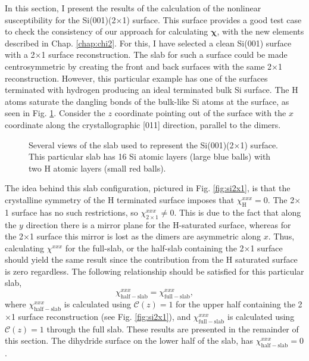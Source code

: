 In this section, I present the results of the calculation of the nonlinear
susceptibility for the Si(001)(2$\times$1) surface. This surface provides a good
test case to check the consistency of our approach for calculating
$\boldsymbol{\chi}$, with the new elements described in Chap. \ref{chap:chi2}.
For this, I have selected a clean Si(001) surface with a 2$\times$1 surface
reconstruction. The slab for such a surface could be made centrosymmetric by
creating the front and back surfaces with the same 2$\times$1 reconstruction.
However, this particular example has one of the surfaces terminated with
hydrogen producing an ideal terminated bulk Si surface. The H atoms saturate the
dangling bonds of the bulk-like Si atoms at the surface, as seen in Fig.
\ref{fig:2x1struc}. Consider the $z$ coordinate pointing out of the surface with
the $x$ coordinate along the crystallographic [011] direction, parallel to the
dimers.

\begin{figure}[H]
\centering
{}\hfill
{}\hfill
{}
\caption{Several views of the slab used to represent the Si(001)(2$\times$1)
surface. This particular slab has 16 Si atomic layers (large blue balls) with
two H atomic layers (small red balls).}
\label{fig:2x1struc}
\end{figure}

The idea behind this slab configuration, pictured in Fig. \ref{fig:si2x1}, is
that the crystalline symmetry of the H terminated surface imposes that
$\chi_{\mathrm{H}}^{xxx}=0$. The 2$\times$1 surface has no such restrictions, so
$\chi_{2\times 1}^{xxx}\ne 0$. This is due to the fact that along the $y$
direction there is a mirror plane for the H-saturated surface, whereas for the
2$\times$1 surface this mirror is lost as the dimers are asymmetric along $x$.
Thus, calculating $\chi^{xxx}$ for the full-slab, or the half-slab containing
the 2$\times$1 surface \cite{note1} should yield the same result since the
contribution from the H saturated surface is zero regardless. The following
relationship should be satisfied for this particular slab,
\begin{equation*}
\chi_{\mathrm{half-slab}}^{xxx} =
\chi_{\mathrm{full-slab}}^{xxx},
\end{equation*}
where $\chi_{\mathrm{half-slab}}^{xxx}$ is calculated using
${\mathbf{\mathcal{C}}}(z)=1$ for the upper half containing the 2$\times$1
surface reconstruction (see Fig. \ref{fig:si2x1}), and
$\chi_{\mathrm{full-slab}}^{xxx}$ is calculated using
${\mathbf{\mathcal{C}}}(z)=1$ through the full slab. These results are presented
in the remainder of this section. The dihydride surface on the lower half of the
slab, has $\chi_{\mathrm{half-slab}}^{xxx} = 0$.

